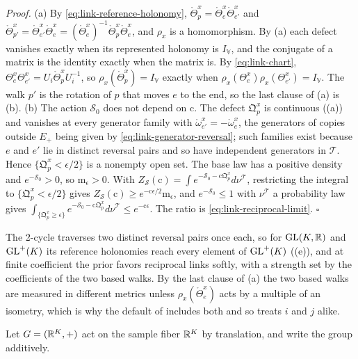 \noindent\emph{Proof.}
(a) By \cref{eq:link-reference-holonomy}, $\mathring\Theta^x_p=\mathring\Theta^x_e\mathring\Theta^x_{e'}$ and
$\mathring\Theta^x_{p'}=\mathring\Theta^x_{e'}\mathring\Theta^x_e=(\mathring\Theta^x_e)^{-1}\mathring\Theta^x_p\mathring\Theta^x_e$,
and $\rho_x$ is a homomorphism. By (a) each defect vanishes exactly when its
represented holonomy is $I_{\mathbb V}$, and the conjugate of a matrix is the identity exactly when the
matrix is. By \cref{eq:link-chart}, $\Theta^x_e\Theta^x_{e'}=U_i\mathring\Theta^x_p U_i^{-1}$, so
$\rho_x(\mathring\Theta^x_p)=I_{\mathbb V}$ exactly when $\rho_x(\Theta^x_e)\rho_x(\Theta^x_{e'})=I_{\mathbb V}$. The
walk $p'$ is the rotation of $p$ that moves $e$ to the end, so the last clause of (a) is
(b).
(b) The action $\mathscr S_0$ does not depend on $\mathrm c$. The defect $\mathfrak Q^x_p$ is continuous
((a)) and vanishes at every generator family with
$\mathring\omega^x_{e'}=-\mathring\omega^x_e$, the generators of copies outside $E_+$ being given by
\cref{eq:link-generator-reversal}; such families exist because $e$ and $e'$ lie in distinct reversal
pairs and so have independent generators in $\mathscr T$. Hence $\{\mathfrak Q^x_p<\epsilon/2\}$ is a nonempty open set. The
base law has a positive density and $e^{-\mathscr S_0}>0$, so $\mathrm m_\epsilon>0$. With
$Z_{\mathscr S}(\mathrm c)=\int e^{-\mathscr S_0-\mathrm c\mathfrak Q^x_p}d\nu^{\mathscr T}$, restricting the
integral to $\{\mathfrak Q^x_p<\epsilon/2\}$ gives $Z_{\mathscr S}(\mathrm c)\geq e^{-\mathrm c\epsilon/2}\mathrm m_\epsilon$,
and $e^{-\mathscr S_0}\leq1$ with $\nu^{\mathscr T}$ a probability law gives
$\int_{\{\mathfrak Q^x_p\geq\epsilon\}}e^{-\mathscr S_0-\mathrm c\mathfrak Q^x_p}d\nu^{\mathscr T}\leq e^{-\mathrm c\epsilon}$.
The ratio is \eqref{eq:link-reciprocal-limit}. \hfill$\square$

The 2-cycle traverses two distinct reversal pairs once each, so for $\mathrm{GL}(K,\mathbb R)$ and $\mathrm{GL}^+(K)$ its
reference holonomies reach every element of $\mathrm{GL}^+(K)$ ((e)), and at finite
coefficient the prior favors reciprocal links softly, with a strength set by the coefficients of the two
based walks. By the last clause of (a) the two based walks are measured in different metrics unless
$\rho_x(\mathring\Theta^x_e)$ acts by a multiple of an isometry, which is why the default of
 includes both and so treats $i$ and $j$ alike.

Let $G=(\mathbb R^K,+)$ act on the sample fiber $\mathbb R^K$ by translation, and write the group additively.

